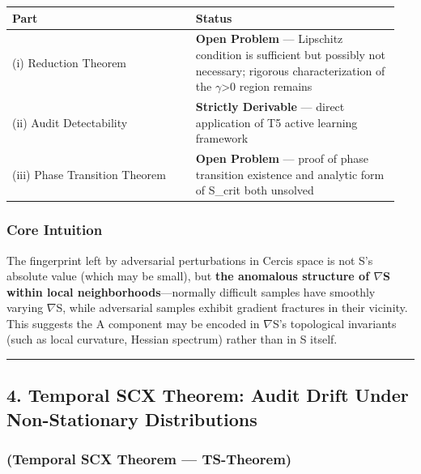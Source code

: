 \documentclass[
  12pt,
]{article}
\begin{document}
\begin{longtable}[]{@{}p{0.45\linewidth}p{0.50\linewidth}@{}}
\toprule\noalign{}
\begin{minipage}[b]{\linewidth}\raggedright
Part
\end{minipage} & \begin{minipage}[b]{\linewidth}\raggedright
Status
\end{minipage} \\
\midrule\noalign{}
\endhead
\bottomrule\noalign{}
\endlastfoot
(i) Reduction Theorem & \textbf{Open Problem} --- Lipschitz condition is sufficient but possibly not necessary; rigorous characterization of the $\gamma$>0 region remains \\
(ii) Audit Detectability & \textbf{Strictly Derivable} --- direct application of T5 active learning framework \\
(iii) Phase Transition Theorem & \textbf{Open Problem} --- proof of phase transition existence and analytic form of S\_crit both unsolved \\
\end{longtable}

\subsubsection{Core Intuition}\label{core-intuition-ar}

The fingerprint left by adversarial perturbations in Cercis space is not S's absolute value (which may be small), but \textbf{the anomalous structure of $\nabla$S within local neighborhoods}---normally difficult samples have smoothly varying $\nabla$S, while adversarial samples exhibit gradient fractures in their vicinity. This suggests the A component may be encoded in $\nabla$S's topological invariants (such as local curvature, Hessian spectrum) rather than in S itself.

\begin{center}\rule{0.5\linewidth}{0.5pt}\end{center}

\subsection{4. Temporal SCX Theorem: Audit Drift Under Non-Stationary Distributions}\label{temporal-scx-theorem}

\subsubsection{(Temporal SCX Theorem --- TS-Theorem)}\label{ts-theorem-next}
\end{document}
